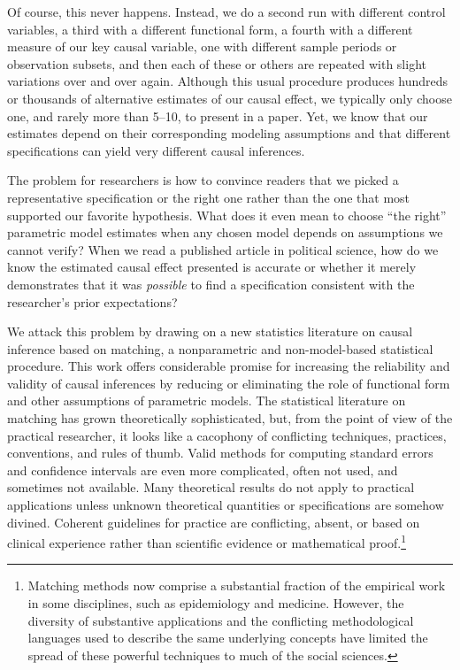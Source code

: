 \documentclass[11pt,titlepage]{article}
\begin{document}
Of course, this never happens.  Instead, we do a second run with
different control variables, a third with a different functional form,
a fourth with a different measure of our key causal variable, one with
different sample periods or observation subsets, and then each of
these or others are repeated with slight variations over and over
again.  Although this usual procedure produces hundreds or thousands
of alternative estimates of our causal effect, we typically only
choose one, and rarely more than 5--10, to present in a paper.  Yet,
we know that our estimates depend on their corresponding modeling
assumptions and that different specifications can yield very different
causal inferences.

The problem for researchers is how to convince readers that we picked
a representative specification or the right one rather than the one
that most supported our favorite hypothesis.  What does it even mean
to choose ``the right'' parametric model estimates when any chosen
model depends on assumptions we cannot verify?  When we read a
published article in political science, how do we know the estimated
causal effect presented is accurate or whether it merely demonstrates
that it was \emph{possible} to find a specification consistent with
the researcher's prior expectations?

We attack this problem by drawing on a new statistics literature on
causal inference based on matching, a nonparametric and
non-model-based statistical procedure.  This work offers considerable
promise for increasing the reliability and validity of causal
inferences by reducing or eliminating the role of functional form and
other assumptions of parametric models.  The statistical literature on
matching has grown theoretically sophisticated, but, from the point of
view of the practical researcher, it looks like a cacophony of
conflicting techniques, practices, conventions, and rules of thumb.
Valid methods for computing standard errors and confidence intervals
are even more complicated, often not used, and sometimes not
available.  Many theoretical results do not apply to practical
applications unless unknown theoretical quantities or specifications
are somehow divined.  Coherent guidelines for practice are
conflicting, absent, or based on clinical experience rather than
scientific evidence or mathematical proof.\footnote{Matching methods
  now comprise a substantial fraction of the empirical work in some
  disciplines, such as epidemiology and medicine.  However, the
  diversity of substantive applications and the conflicting
  methodological languages used to describe the same underlying
  concepts have limited the spread of these powerful techniques to
  much of the social sciences.}
\end{document}
